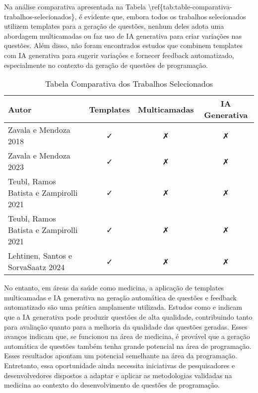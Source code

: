 Na análise comparativa apresentada na Tabela \textbackslash{}ref\{tab:table-comparativa-trabalhos-selecionados\}, é evidente  que, embora todos os trabalhos selecionados utilizem templates para a geração de questões, nenhum deles adota uma abordagem multicamadas ou faz uso de IA generativa para criar variações nas questões. Além disso, não foram encontrados estudos que combinem templates com IA generativa para sugerir variações e fornecer feedback automatizado, especialmente no contexto da geração de questões de programação. 

\begin{table}[htbp]
    \centering
    \begin{tabular}{|l|c|c|c|}
        \hline
        Autor& Templates & Multicamadas & IA Generativa \\ \hline
        Zavala e Mendoza 2018& \faCheck & \faClose& \faClose\\ \hline 
        Zavala e Mendoza 2023 & \faCheck&  \faClose& \faClose\\ \hline
        Teubl, Ramos Batista e Zampirolli 2021 & \faCheck& \faClose& \faClose\\\hline
 Teubl, Ramos Batista e Zampirolli 2021& \faCheck & \faClose&\faClose \\\hline
 Lehtinen, Santos e SorvaSaatz 2024 & \faCheck & \faClose&\faClose \\\hline
    \end{tabular}
    \caption{Tabela Comparativa dos Trabalhos Selecionados}
    \label{tab:table-comparativa-trabalhos-selecionados}
\end{table}



No entanto, em áreas da saúde como medicina, a aplicação de templates multicamadas e IA generativa na geração automática de questões e feedback automatizado são uma prática amplamente utilizada. Estudos como \parencite{falcao2023} e \parencite{kiyak2024} indicam que a IA generativa pode produzir questões de alta qualidade, contribuindo tanto para avaliação quanto para a melhoria da qualidade das questões geradas. Esses avanços indicam que, se funcionou na área de medicina, é provável que a geração automática de questões também tenha grande potencial na área de programação. Esses resultados apontam um potencial semelhante na área da programação. Entretanto, essa oportunidade ainda necessita iniciativas de pesquisadores e desenvolvedores dispostos a adaptar e aplicar as metodologias validadas na medicina ao contexto do desenvolvimento de questões de programação. 

